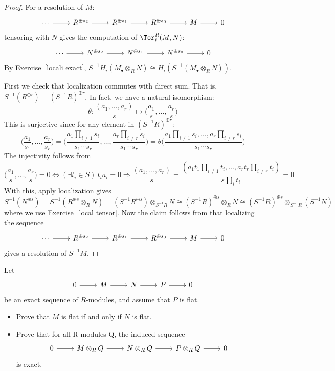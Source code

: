 \begin{proof}
For a resolution of $M$:
\[\begin{tikzcd}
\cdots\ar[r]&R^{\oplus s_2}\ar[r]&R^{\oplus s_1}\ar[r]&R^{\oplus s_0}\ar[r]&M\ar[r]&0
\end{tikzcd}\]
tensoring with $N$ gives the computation of $\Tor^R_i(M,N)$:
\[\begin{tikzcd}
\cdots\ar[r]&N^{\oplus s_2}\ar[r]&N^{\oplus s_1}\ar[r]&N^{\oplus s_0}\ar[r]&0
\end{tikzcd}\]
By Exercise~\ref{locali exact}, $S^{-1}H_i(M_{\bullet}\otimes_{R}N)\cong H_i(S^{-1}(M_{\bullet}\otimes_{R}N))$.\par
First we check that localization commutes with direct sum. That is, $S^{-1}(R^{\oplus r})=(S^{-1}R)^{\oplus r}$. In fact, we have a natural isomorphism:
\[\theta:\dfrac{(a_1,\dots,a_r)}{s}\mapsto\Big(\dfrac{a_1}{s},\dots,\dfrac{a_r}{s}\Big)\]
This is surjective since for any element in $(S^{-1}R)^{\oplus r}$:
\[\Big(\dfrac{a_1}{s_1},\dots,\dfrac{a_r}{s_r}\Big)=\Big(\dfrac{a_1\prod_{i\neq 1}s_i}{s_1\cdots s_r},\dots,\dfrac{a_r\prod_{i\neq r}s_i}{s_1\cdots s_r}\Big)=\theta\Big(\dfrac{a_1\prod_{i\neq 1}s_i,\dots,a_r\prod_{i\neq r}s_i}{s_1\cdots s_r}\Big)\]
The injectivity follows from
\[\Big(\dfrac{a_1}{s},\dots,\dfrac{a_r}{s}\Big)=0\iff (\exists t_i\in S)\ t_ia_i=0\Rightarrow \dfrac{(a_1,\dots,a_r)}{s}=\dfrac{(a_1t_1\prod_{i\neq 1}t_i,\dots,a_rt_r\prod_{i\neq r}t_i)}{s\prod_it_i}=0\]
With this, apply localization gives
\[S^{-1}(N^{\oplus s})=S^{-1}(R^{\oplus s}\otimes_{R}N)=(S^{-1}R^{\oplus s})\otimes_{S^{-1}R}N\cong (S^{-1}R)^{\oplus s}\otimes_{R}N\cong(S^{-1}R)^{\oplus s}\otimes_{S^{-1}R}(S^{-1}N)\]
where we use Exercise~\ref{local tensor}. Now the claim follows from that localizing the sequence
\[\begin{tikzcd}
\cdots\ar[r]&R^{\oplus s_2}\ar[r]&R^{\oplus s_1}\ar[r]&R^{\oplus s_0}\ar[r]&M\ar[r]&0
\end{tikzcd}\]
gives a resolution of $S^{-1}M$.
\end{proof}
\begin{exercise}\label{flat exact sequence}
Let
\[\begin{tikzcd}
0\ar[r]&M\ar[r]&N\ar[r]&P\ar[r]&0
\end{tikzcd}\]
be an exact sequence of $R$-modules, and assume that $P$ is flat.
\begin{itemize}
\item Prove that $M$ is flat if and only if $N$ is flat.
\item Prove that for all R-modules Q, the induced sequence
\[\begin{tikzcd}
0\ar[r]&M\otimes_{R}Q\ar[r]&N\otimes_{R}Q\ar[r]&P\otimes_{R}Q\ar[r]&0
\end{tikzcd}\]
is exact.
\end{itemize}
\end{exercise}
